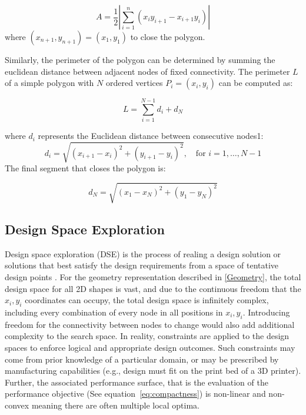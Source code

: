 \documentclass{article}
\begin{document}
\begin{equation}
A = \frac{1}{2} \left| \sum_{i=1}^{n} (x_i y_{i+1} - x_{i+1} y_i) \right|
\label{area_equaton}
\end{equation}
where \((x_{n+1}, y_{n+1}) = (x_1, y_1)\) to close the polygon.

Similarly, the perimeter of the polygon can be determined by summing the euclidean distance between adjacent nodes of fixed connectivity. The perimeter \( L \) of a simple polygon with \( N \) ordered vertices \( P_i = (x_i, y_i) \) can be computed as:


\begin{equation}
    L = \sum_{i=1}^{N-1} d_i + d_N
    \label{perimiter_equaton}
\end{equation}

where \( d_i \) represents the Euclidean distance between consecutive nodes1:
\[
d_i = \sqrt{(x_{i+1} - x_i)^2 + (y_{i+1} - y_i)^2}, \quad \text{for } i = 1, \dots, N-1
\]
The final segment that closes the polygon is:

\[
d_N = \sqrt{(x_1 - x_N)^2 + (y_1 - y_N)^2}
\]

\subsection{Design Space Exploration}
Design space exploration (DSE) is the process of realing a design solution or solutions that best satisfy the design requirements from a space of tentative design points \citep{CARDOSO2017255}. For the geometry representation described in \ref{Geometry}, the total design space for all 2D shapes is vast, and due to the continuous freedom that the $x_i,y_i$ coordinates can occupy, the total design space is infinitely complex, including every combination of every node in all positions in $x_i,y_i$. Introducing freedom for the connectivity between nodes to change would also add additional complexity to the search space. In reality, constraints are applied to the design spaces to enforce logical and appropriate design outcomes. Such constraints may come from prior knowledge of a particular domain, or may be prescribed by manufacturing capabilities (e.g., design must fit on the print bed of a 3D printer). Further, the associated performance surface, that is the evaluation of the performance objective (See equation~\eqref{eq:compactness}) is non-linear and non-convex meaning there are often multiple local optima. 
\end{document}
